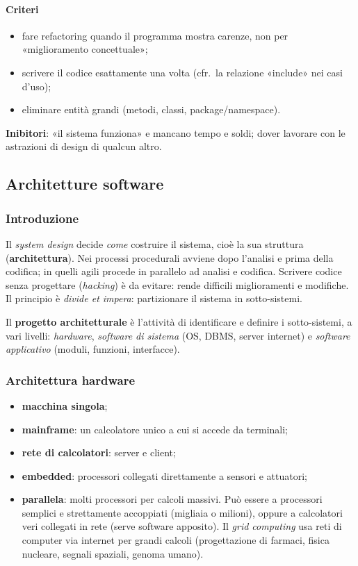 \documentclass[a4paper,12pt]{article}
\begin{document}
\paragraph{Criteri}
\begin{itemize}
  \item fare refactoring quando il programma mostra carenze, non per «miglioramento
        concettuale»;
  \item scrivere il codice esattamente una volta (cfr.\ la relazione
        «include» nei casi d'uso);
  \item eliminare entità grandi (metodi, classi, package/namespace).
\end{itemize}
\textbf{Inibitori}: «il sistema funziona» e mancano tempo e soldi; dover lavorare con le
astrazioni di design di qualcun altro.



\newpage
\subsection{Architetture software}

\subsubsection{Introduzione}
Il \emph{system design} decide \emph{come} costruire il sistema, cioè la sua struttura
(\textbf{architettura}). Nei processi procedurali avviene dopo l'analisi e prima della
codifica; in quelli agili procede in parallelo ad analisi e codifica. Scrivere codice
senza progettare (\emph{hacking}) è da evitare: rende difficili miglioramenti e modifiche.
Il principio è \emph{divide et impera}: partizionare il sistema in sotto-sistemi.

Il \textbf{progetto architetturale} è l'attività di identificare e definire i
sotto-sistemi, a vari livelli: \emph{hardware}, \emph{software di sistema} (OS, DBMS,
server internet) e \emph{software applicativo} (moduli, funzioni, interfacce).

\subsubsection{Architettura hardware}
\begin{itemize}
  \item \textbf{macchina singola};
  \item \textbf{mainframe}: un calcolatore unico a cui si accede da terminali;
  \item \textbf{rete di calcolatori}: server e client;
  \item \textbf{embedded}: processori collegati direttamente a sensori e attuatori;
  \item \textbf{parallela}: molti processori per calcoli massivi. Può essere a
        processori semplici e strettamente accoppiati (migliaia o milioni), oppure a
        calcolatori veri collegati in rete (serve software apposito). Il \emph{grid
        computing} usa reti di computer via internet per grandi calcoli (progettazione
        di farmaci, fisica nucleare, segnali spaziali, genoma umano).
\end{itemize}
\end{document}
